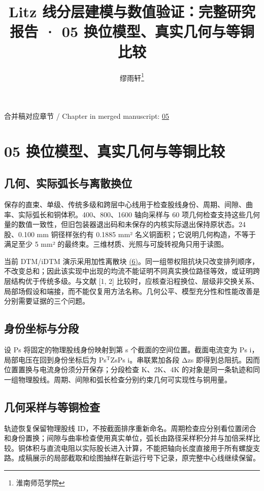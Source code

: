 \documentclass[journal,10pt]{IEEEtran}
\begin{document}
\title{Litz 线分层建模与数值验证：完整研究报告 · 05 换位模型、真实几何与等铜比较}
\author{缪雨轩\thanks{淮南师范学院}}

\maketitle
\noindent 合并稿对应章节 / Chapter in merged manuscript: \href{report_zh-CN_ieee.pdf#chapter-05}{05}\par
\FloatBarrier
\section*{05 换位模型、真实几何与等铜比较}
\hypertarget{chapter-05}{}
\subsection*{几何、实际弧长与离散换位}
\hypertarget{05.geometry.heading}{}
保存的直束、单级、传统多级和跨层中心线用于检查股线身份、周期、间隙、曲率、实际弧长和铜体积。400、800、1600 轴向采样与 60 项几何检查支持这些几何量的数值一致性，但旧包装器退出码和未保存的内核实际退出保持原状态。24 股、0.100 mm 铜径样张约有 0.1885 mm² 名义铜面积；它说明几何构造，不等于满足至少 5 mm² 的最终束。三维材质、光照与可旋转视角只用于读图。


当前 DTM/iDTM 演示采用加性离散块 \href{report_zh-CN_ieee.pdf#E06}{(6)}。同一组带权阻抗块只改变排列顺序，不改变总和；因此该实现中出现的均流不能证明不同真实换位路径等效，或证明跨层结构优于传统多级。与文献 [1, 2] 比较时，应核查沿程换位、层级非交换关系、局部场假设和端接，而不能仅复用方法名称。几何公平、模型充分性和性能改善是分别需要证据的三个问题。


\subsection*{身份坐标与分段}
\hypertarget{05.dtm_derivation.heading}{}
设 Ps 将固定的物理股线身份映射到第 s 个截面的空间位置。截面电流变为 Ps i，局部电压在回到身份坐标后为 Ps\(^{\mathrm T}\)ZsPs i。串联累加各段 Δzs 即得到总阻抗。因而位置置换与电流身份须分开保存；分段检查 K、2K、4K 的对象是同一条轨迹和同一组物理股线。周期、间隙和弧长检查分别约束几何可实现性与铜用量。


\subsection*{几何采样与等铜检查}
\hypertarget{05.report_geometry.heading}{}
轨迹恢复保留物理股线 ID，不按截面排序重新命名。周期检查应分别看位置闭合和身份置换；间隙与曲率检查使用真实单位，弧长由路径采样积分并与加倍采样比较。铜体积与直流电阻以实际股长进入计算，不能把轴向长度直接用于所有螺旋支路。成稿展示的局部截取和绘图抽样在新运行号下记录，原完整中心线继续保留。
\end{document}
